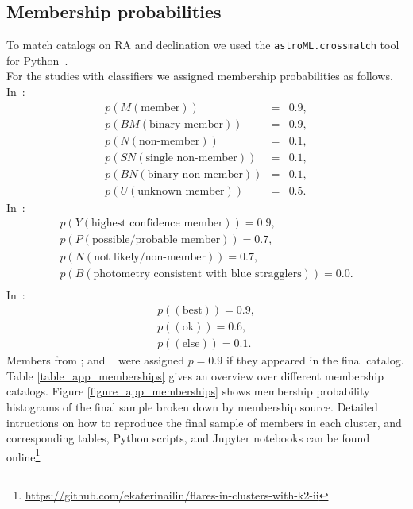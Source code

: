 \documentclass{aa}
\begin{document}
\begin{appendix}
\section{Membership probabilities}

To match catalogs on RA and declination we used the \texttt{astroML.crossmatch} tool for Python~\citep{astroML}.
\\
For the studies with classifiers we assigned membership probabilities as follows.
In~\citet{gonzalez_m67mem_2016}:
\begin{eqnarray*}
p(M (\text{member}))&=&0.9,\\
p(BM(\text{binary member}))&=&0.9,\\
p(N (\text{non-member}))&=&0.1,\\
p(SN(\text{single non-member}))&=&0.1,\\
p(BN (\text{binary non-member}))&=&0.1,\\
p(U (\text{unknown member}))&=&0.5.
\end{eqnarray*}
In~\citet{curtis_ruprecht_2013}:
\begin{eqnarray*}
p(Y (\text{highest confidence member}))=0.9,\\
p(P (\text{possible/probable member}))=0.7,\\
p(N (\text{not likely/non-member}))=0.7,\\
p(B (\text{photometry consistent with blue stragglers}))=0.0.\\
\end{eqnarray*}
In~\citet{rebull_praesepe_2017}:
\begin{eqnarray*}
p((\text{best}))=0.9,\\
p((\text{ok}))=0.6,\\
p((\text{else}))=0.1.
\end{eqnarray*}
Members from \citet{rebull_rotation_2016, douglas_poking_2017}; and ~\citet{gaia_dr2_2018_hrd} were assigned $p=0.9$ if they appeared in the final catalog.
\\
Table \ref{table_app_memberships} gives an overview over different membership catalogs. Figure \ref{figure_app_memberships} shows membership probability histograms of the final sample broken down by membership source. Detailed intructions on how to reproduce the final sample of members in each cluster, and corresponding tables, Python scripts, and Jupyter notebooks can be found online\footnote{\url{https://github.com/ekaterinailin/flares-in-clusters-with-k2-ii}}



\end{appendix}
\end{document}
